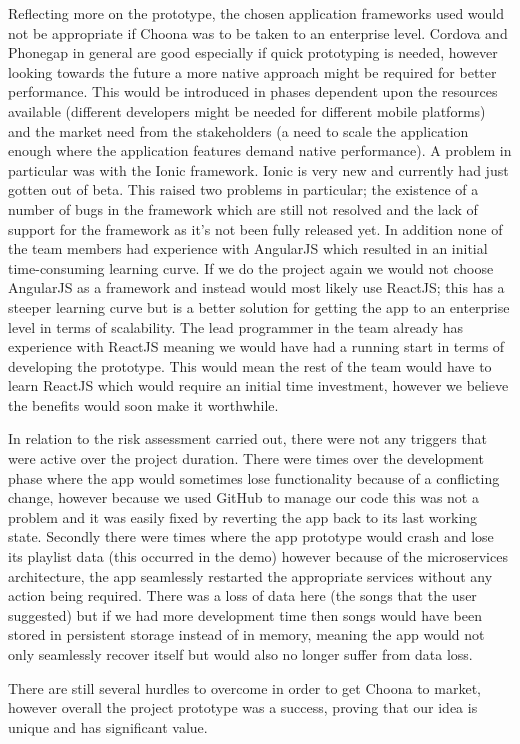Reflecting more on the prototype, the chosen application frameworks used would not be appropriate if Choona was to be taken to an enterprise level. Cordova and Phonegap in general are good especially if quick prototyping is needed, however looking towards the future a more native approach might be required for better performance. This would be introduced in phases dependent upon the resources available (different developers might be needed for different mobile platforms) and the market need from the stakeholders (a need to scale the application enough where the application features demand native performance). A problem in particular was with the Ionic framework. Ionic is very new and currently had just gotten out of beta. This raised two problems in particular; the existence of a number of bugs in the framework which are still not resolved and the lack of support for the framework as it's not been fully released yet. In addition none of the team members had experience with AngularJS which resulted in an initial time-consuming learning curve. If we do the project again we would not choose AngularJS as a framework and instead would most likely use ReactJS; this has a steeper learning curve but is a better solution for getting the app to an enterprise level in terms of scalability. The lead programmer in the team already has experience with ReactJS meaning we would have had a running start in terms of developing the prototype. This would mean the rest of the team would have to learn ReactJS which would require an initial time investment, however we believe the benefits would soon make it worthwhile.

In relation to the risk assessment carried out, there were not any triggers that were active over the project duration. There were times over the development phase where the app would sometimes lose functionality because of a conflicting change, however because we used GitHub to manage our code this was not a problem and it was easily fixed by reverting the app back to its last working state. Secondly there were times where the app prototype would crash and lose its playlist data (this occurred in the demo) however because of the microservices architecture, the app seamlessly restarted the appropriate services without any action being required. There was a loss of data here (the songs that the user suggested) but if we had more development time then songs would have been stored in persistent storage instead of in memory, meaning the app would not only seamlessly recover itself but would also no longer suffer from data loss.

There are still several hurdles to overcome in order to get Choona to market, however overall the project prototype was a success, proving that our idea is unique and has significant value.